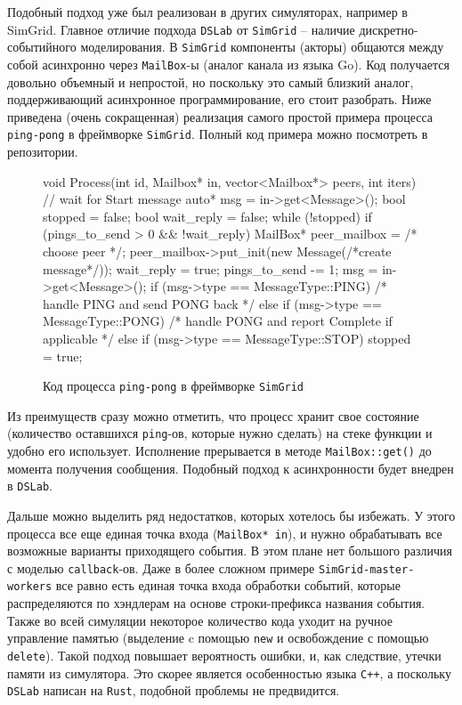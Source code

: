 Подобный подход уже был реализован в других симуляторах, например в SimGrid\cite{simgrid-article}. Главное отличие подхода \texttt{DSLab} от \texttt{SimGrid} -- наличие дискретно-событийного моделирования. В \texttt{SimGrid} компоненты (акторы) общаются между собой асинхронно через \texttt{MailBox}-ы (аналог канала из языка Go). Код получается довольно объемный и непростой, но поскольку это самый близкий аналог, поддерживающий асинхронное программирование, его стоит разобрать. Ниже приведена (очень сокращенная) реализация самого простой примера процесса \texttt{ping-pong} в фреймворке \texttt{SimGrid}. Полный код примера можно посмотреть в репозитории\cite{simgrid-example}.
\begin{figure}[H]
    \centering
    \small
\begin{cppcode}
void Process(int id, Mailbox* in, vector<Mailbox*> peers, int iters) {
    // wait for Start message
    auto* msg = in->get<Message>();
    bool stopped = false;
    bool wait_reply = false;
    while (!stopped) {
        if (pings_to_send > 0 && !wait_reply) {
            MailBox* peer_mailbox = /* choose peer */;
            peer_mailbox->put_init(new Message(/*create message*/));
            wait_reply = true;
            pings_to_send -= 1;
        }
        msg = in->get<Message>();
        if (msg->type == MessageType::PING) {
            /* handle PING and send PONG back */
        } else if (msg->type == MessageType::PONG) {
            /* handle PONG and report Complete if applicable */
        } else if (msg->type == MessageType::STOP) {
            stopped = true;
        }
    }
}
\end{cppcode}
\caption{Код процесса \texttt{ping-pong} в фреймворке \texttt{SimGrid}}
\label{simgridcode}
\end{figure}

Из преимуществ сразу можно отметить, что процесс хранит свое состояние (количество оставшихся \texttt{ping}-ов, которые нужно сделать) на стеке функции и удобно его использует. Исполнение прерывается в методе \texttt{MailBox::get()} до момента получения сообщения. Подобный подход к асинхронности будет внедрен в \texttt{DSLab}.

Дальше можно выделить ряд недостатков, которых хотелось бы избежать. У этого процесса все еще единая точка входа (\texttt{MailBox* in}), и нужно обрабатывать все возможные варианты приходящего события. В этом плане нет большого различия с моделью \texttt{callback}-ов. Даже в более сложном примере \texttt{SimGrid-master-workers}\cite{simgrid-master-workers} все равно есть единая точка входа обработки событий, которые распределяются по хэндлерам на основе строки-префикса названия события.   
Также во всей симуляции некоторое количество кода уходит на ручное управление памятью (выделение c помощью \texttt{new} и освобождение с помощью \texttt{delete}). Такой подход повышает вероятность ошибки, и, как следствие, утечки памяти из симулятора. Это скорее является особенностью языка \texttt{C++}, а поскольку \texttt{DSLab} написан на \texttt{Rust}, подобной проблемы не предвидится.  


